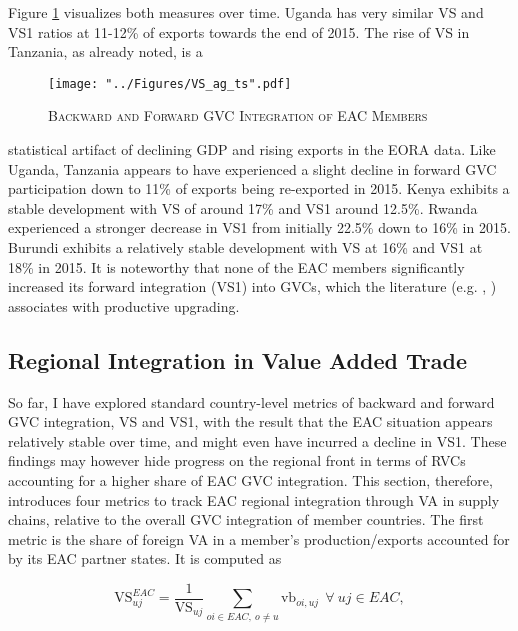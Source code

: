 \documentclass[a4paper]{article}
\begin{document}
Figure \ref{fig:VSag_ts} visualizes both measures over time. Uganda has very similar VS and VS1 ratios at 11-12\% of exports towards the end of 2015. The rise of VS in Tanzania, as already noted, is a 

\begin{figure}[h!]
\centering
\caption{\label{fig:VSag_ts}\textsc{Backward and Forward GVC Integration of EAC Members}}
\texttt{[image: "../Figures/VS\_ag\_ts".pdf]} %
\end{figure}
\FloatBarrier

\noindent statistical artifact of declining GDP and rising exports in the EORA data. Like Uganda, Tanzania appears to have experienced a slight decline in forward GVC participation down to 11\% of exports being re-exported in 2015. Kenya exhibits a stable development with VS of around 17\% and VS1 around 12.5\%. Rwanda experienced a stronger decrease in VS1 from initially 22.5\% down to 16\% in 2015. Burundi exhibits a relatively stable development with VS at 16\% and VS1 at 18\% in 2015. It is noteworthy that none of the EAC members significantly increased its forward integration (VS1) into GVCs, which the literature (e.g. \citet{foster2015global}, \citet{Kummritz20161, Kummritz20162}) associates with productive upgrading. %


\subsection{Regional Integration in Value Added Trade}

So far, I have explored standard country-level metrics of backward and forward GVC integration, VS and VS1, with the result that the EAC situation appears relatively stable over time, and might even have incurred a decline in VS1. These findings may however hide progress on the regional front in terms of RVCs accounting for a higher share of EAC GVC integration. This section, therefore, introduces four metrics to track EAC regional integration through VA in supply chains, relative to the overall GVC integration of member countries. The first metric is the share of foreign VA in a member's production/exports accounted for by its EAC partner states. It is computed as

\begin{equation} \label{eq:VS_EAC}
\text{VS}_{uj}^{EAC} = \frac{1}{\text{VS}_{uj}}  \sum_{oi \in EAC,\ o \neq  u} \text{vb}_{oi, uj}   \ \ \forall\ uj \in EAC,
\end{equation}
\end{document}
